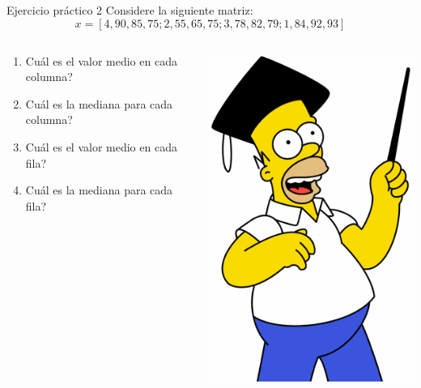 \documentclass{bredelebeamer}
\begin{document}
\begin{frame}{Ejercicio práctico 2}
Considere la siguiente matriz:
\begin{equation*}
x = [4, 90, 85, 75 ; 2, 55, 65, 75 ; 3, 78, 82, 79 ; 1, 84, 92, 93]
\end{equation*}
\begin{columns}
\begin{column}{0.6\textwidth}
\begin{center}
\begin{enumerate}
\item Cuál es el valor medio en cada columna?
\item Cuál es la mediana para cada columna?
\item Cuál es el valor medio en cada fila?
\item Cuál es la mediana para cada fila?
\end{enumerate}
\end{center}
\end{column}
\begin{column}{0.4\textwidth}
\begin{center}
\includegraphics[scale=0.2]{images/img42.png}
\end{center}
\end{column}
\end{columns}
\end{frame}
\end{document}
